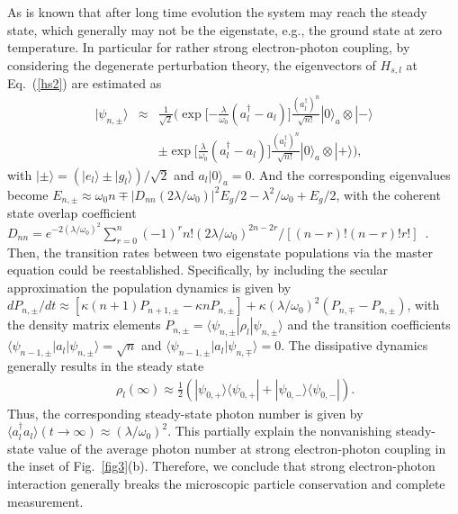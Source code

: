 \documentclass[twocolumn,showpacs,preprintnumbers,amsmath,amssymb]{revtex4}
\begin{document}
	As is known that after long time evolution the system may reach the steady state,
	which generally may not be the eigenstate, e.g., the ground state at zero temperature.
	In particular for rather strong electron-photon coupling,
	by considering the degenerate perturbation theory,
	the eigenvectors of $H_{s,l}$ at Eq.~(\ref{hs2}) are estimated as
	\begin{eqnarray}
		|\psi_{n,\pm}{\rangle}&{\approx}&\frac{1}{\sqrt{2}}
		\Big(\exp\Big[{-\frac{\lambda}{\omega_0}(a^\dag_{l}-a_{l})}\Big]
		\frac{(a^\dag_{l})^n}{\sqrt{n!}}|0{\rangle}_a{\otimes}|-{\rangle}\nonumber\\
		&&{\pm}\exp\Big[{\frac{\lambda}{\omega_0}(a^\dag_{l}-a_{l})}\Big]
		\frac{(a^\dag_{l})^n}{\sqrt{n!}}|0{\rangle}_a{\otimes}|+{\rangle}\Big),
	\end{eqnarray}
	with $|\pm{\rangle}=(|e_{{l}}{\rangle}{\pm}|g_{{l}}{\rangle})/\sqrt{2}$
	and $a_{l}|0{\rangle}_a=0$.
	And the corresponding eigenvalues become
	$E_{n,\pm}\approx\omega_0n{\mp}|D_{nn}(2\lambda/\omega_0)|^2E_g/2  -\lambda^2/\omega_0+E_g/2$,
with the coherent state overlap coefficient
$D_{nn}=e^{-2(\lambda/\omega_0)^2}\sum^n_{r=0}(-1)^rn!(2\lambda/\omega_0)^{2n-2r}/[(n-r)!(n-r)!r!]$~\cite{qhchen2008pra}.
	Then, the transition rates between two eigenstate populations via the master equation could be reestablished.
	Specifically, by including the secular approximation
	the population dynamics is given by
	$dP_{n,\pm}/dt{\approx}[\kappa{(n+1)}P_{n+1,\pm}-\kappa{n}P_{n,\pm}]
	+\kappa(\lambda/\omega_0)^2(P_{n,\mp}-P_{n,\pm})$,
	with the density matrix elements
	$P_{n,\pm}={\langle}\psi_{n,\pm}|\rho_l|\psi_{n,\pm}{\rangle}$
	and the transition coefficients
	${\langle}\psi_{n-1,\pm}|a_{l}|\psi_{n,\pm}{\rangle}=\sqrt{n}$
	and
	${\langle}\psi_{n-1,\pm}|a_{l}|\psi_{n,\mp}{\rangle}=0$.
	The dissipative dynamics generally  results in the steady state
	\begin{eqnarray}~\label{ss1}
		\rho_{l}(\infty){\approx}\frac{1}{2}
		(|\psi_{0,+}{\rangle}{\langle}\psi_{0,+}|+|\psi_{0,-}{\rangle}{\langle}\psi_{0,-}|).
	\end{eqnarray}
	Thus, the corresponding steady-state photon number is given by
	${\langle}a^\dag_{l}a_{l}{\rangle}(t{\rightarrow}\infty){\approx}({\lambda}/{\omega_0})^2$.
	This partially explain the nonvanishing steady-state value of the average photon number at strong electron-photon coupling in the inset of Fig.~\ref{fig3}(b).
	Therefore, we conclude that strong electron-photon interaction generally breaks the microscopic particle conservation and  complete measurement.
	
\end{document}
